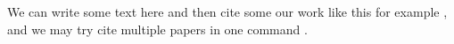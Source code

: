 \documentclass{article}
\begin{document}
We can write some text here and then cite some our work like this for example , and we may try cite multiple papers in one command .

\end{document}
